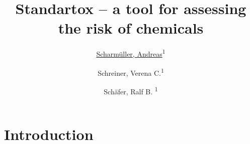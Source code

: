 \documentclass[10pt, a4paper, english]{article}
\begin{document}
\title{\textbf{Standartox – a tool for assessing the risk of chemicals}}

\author{\uline{Scharmüller, Andreas}\textsuperscript{1}}
\author{Schreiner, Verena C.\textsuperscript{1}}
\author{Schäfer, Ralf B. \textsuperscript{1}}
\date{\vspace{-5ex}}


\maketitle

\section{Introduction}
\end{document}
